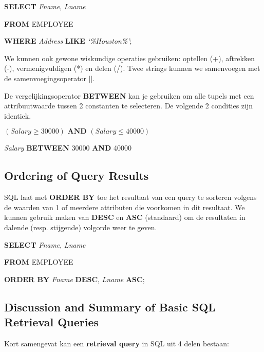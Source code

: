 \vspace{1mm}\hspace{10mm}
\textbf{SELECT} \textit{Fname}, \textit{Lname}

\hspace{10mm}
\textbf{FROM} EMPLOYEE

\hspace{10mm}
\textbf{WHERE} \textit{Address} \textbf{LIKE} \textit{`\%Houston\%'};
\vspace{3mm}

\noindent We kunnen ook gewone wiskundige operaties gebruiken: optellen (+), aftrekken (-), vermenigvuldigen (*) en delen (/). Twee strings kunnen we samenvoegen met de samenvoegingsoperator $||$.

De vergelijkingsoperator \textbf{BETWEEN} kan je gebruiken om alle tupels met een attribuutwaarde tussen 2 constanten te selecteren. De volgende 2 condities zijn identiek.

\vspace{1mm}\hspace{10mm}
$(\textit{Salary} \geqslant 30000) \textbf{ AND }(\textit{Salary} \leqslant 40000)$

\hspace{10mm}
\textit{Salary} \textbf{BETWEEN} 30000 \textbf{AND} 40000


\subsection{Ordering of Query Results}
SQL laat met \textbf{ORDER BY} toe het resultaat van een query te sorteren volgens de waarden van 1 of meerdere attributen die voorkomen in dit resultaat. We kunnen gebruik maken van \textbf{DESC} en \textbf{ASC} (standaard) om de resultaten in dalende (resp. stijgende) volgorde weer te geven.

\vspace{1mm}\hspace{10mm}
\textbf{SELECT} \textit{Fname}, \textit{Lname}

\hspace{10mm}
\textbf{FROM} EMPLOYEE

\hspace{10mm}
\textbf{ORDER BY} \textit{Fname} \textbf{DESC}, \textit{Lname} \textbf{ASC};


\subsection{Discussion and Summary of Basic SQL Retrieval Queries}
Kort samengevat kan een \textbf{retrieval query} in SQL uit 4 delen bestaan:

